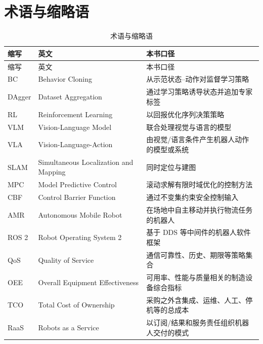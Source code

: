 \chapter{术语与缩略语}
\label{app:glossary}

\begin{longtable}{>{\raggedright\arraybackslash}p{}>{\raggedright\arraybackslash}p{}>{\raggedright\arraybackslash}p{}}
\caption{术语与缩略语}\label{tab:glossary}\\
\toprule
缩写 & 英文 & 本书口径 \\
\midrule\endfirsthead
\toprule 缩写 & 英文 & 本书口径 \\
\midrule\endhead
BC & Behavior Cloning & 从示范状态--动作对监督学习策略 \\
DAgger & Dataset Aggregation & 通过学习策略诱导状态并追加专家标签 \\
RL & Reinforcement Learning & 以回报优化序列决策策略 \\
VLM & Vision-Language Model & 联合处理视觉与语言的模型 \\
VLA & Vision-Language-Action & 由视觉/语言条件产生机器人动作的模型或系统 \\
SLAM & Simultaneous Localization and Mapping & 同时定位与建图 \\
MPC & Model Predictive Control & 滚动求解有限时域优化的控制方法 \\
CBF & Control Barrier Function & 通过不变集约束安全控制输入 \\
AMR & Autonomous Mobile Robot & 在场地中自主移动并执行物流任务的机器人 \\
ROS 2 & Robot Operating System 2 & 基于 DDS 等中间件的机器人软件框架 \\
QoS & Quality of Service & 通信可靠性、历史、期限等策略集合 \\
OEE & Overall Equipment Effectiveness & 可用率、性能与质量相关的制造设备综合指标 \\
TCO & Total Cost of Ownership & 采购之外含集成、运维、人工、停机等的总成本 \\
RaaS & Robots as a Service & 以订阅/结果和服务责任组织机器人交付的模式 \\
\bottomrule
\end{longtable}
